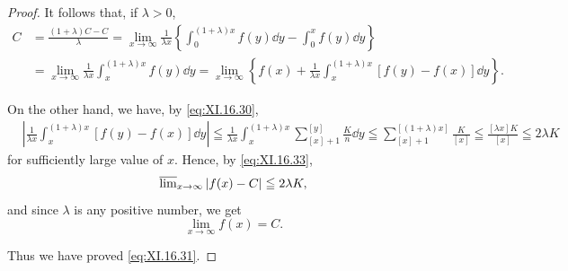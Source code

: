\begin{proof}
It follows that, if $\lambda > 0$, 
\begin{equation}\label{eq:XI.16.33}
\begin{aligned}
C &= \frac {(1 + \lambda) C - C}{\lambda} = \lim\limits _{x \rightarrow \infty} \frac {1}{\lambda x} \left\{\int_{0} ^{(1+ \lambda) x} f (y) \dd y - \int_{0} ^{x} f (y) \dd y \right\}
\\
&= \lim\limits _{x \rightarrow \infty} \frac {1}{\lambda x} \int_{x} ^{(1+ \lambda) x} f (y) \dd y = \lim\limits _{x \rightarrow \infty} \left\{f (x) + \frac {1}{\lambda x} \int_{x} ^{(1+ \lambda) x} [ f (y) - f (x) ] \dd y \right\}.
\end{aligned}
\end{equation}

On the other hand, we have, by \eqref{eq:XI.16.30}, 
\[
\begin{aligned}
&\left| \frac {1}{\lambda x} \int_{x} ^{(1+ \lambda) x} [ f (y) - f (x) ] \dd y \right|  \leqq \frac {1}{\lambda x} \int_{x} ^{(1+ \lambda) x} \sum\limits_{[x]+1} ^{[y]} \frac {K}{n} \dd y \leqq \sum\limits_{[x]+1} ^{[ (1+ \lambda) x ]} \frac {K}{[ x ]} \leqq \frac {[ \lambda x ] K}{[ x ]} \leqq 2 \lambda K
\end{aligned}
\]
for sufficiently large value of $x$. Hence, by \eqref{eq:XI.16.33}, 
\[
\varlimsup\limits_{x \rightarrow \infty} | f (x) - C | \leqq 2 \lambda K,
\]
and since $\lambda$ is any positive number, we get 
\[
\lim\limits _{x \rightarrow \infty} f (x) = C.
\]

Thus we have proved \eqref{eq:XI.16.31}. 
\end{proof}

